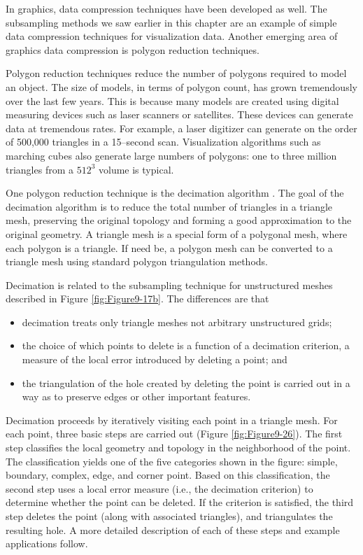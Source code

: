 In graphics, data compression techniques have been developed as well. The subsampling methods we saw earlier in this chapter are an example of simple data compression techniques for visualization data. Another emerging area of graphics data compression is polygon reduction techniques.

Polygon reduction techniques reduce the number of polygons required to model an object. The size of models, in terms of polygon count, has grown tremendously over the last few years. This is because many models are created using digital measuring devices such as laser scanners or satellites. These devices can generate data at tremendous rates. For example, a laser digitizer can generate on the order of 500,000 triangles in a 15--second scan. Visualization algorithms such as marching cubes also generate large numbers of polygons: one to three million triangles from a $512^3$ volume is typical.

One polygon reduction technique is the decimation algorithm \cite{Schroeder92a}. The goal of the decimation algorithm is to reduce the total number of triangles in a triangle mesh, preserving the original topology and forming a good approximation to the original geometry. A triangle mesh is a special form of a polygonal mesh, where each polygon is a triangle. If need be, a polygon mesh can be converted to a triangle mesh using standard polygon triangulation methods.

Decimation is related to the subsampling technique for unstructured meshes described in Figure \ref{fig:Figure9-17b}. The differences are that

\begin{itemize}

\item decimation treats only triangle meshes not arbitrary unstructured grids;

\item the choice of which points to delete is a function of a decimation criterion, a measure of the local error introduced by deleting a point; and

\item the triangulation of the hole created by deleting the point is carried out in a way as to preserve edges or other important features.

\end{itemize}

Decimation proceeds by iteratively visiting each point in a triangle mesh. For each point, three basic steps are carried out (Figure \ref{fig:Figure9-26}). The first step classifies the local geometry and topology in the neighborhood of the point. The classification yields one of the five categories shown in the figure: simple, boundary, complex, edge, and corner point. Based on this classification, the second step uses a local error measure (i.e., the decimation criterion) to determine whether the point can be deleted. If the criterion is satisfied, the third step deletes the point (along with associated triangles), and triangulates the resulting hole. A more detailed description of each of these steps and example applications follow.

